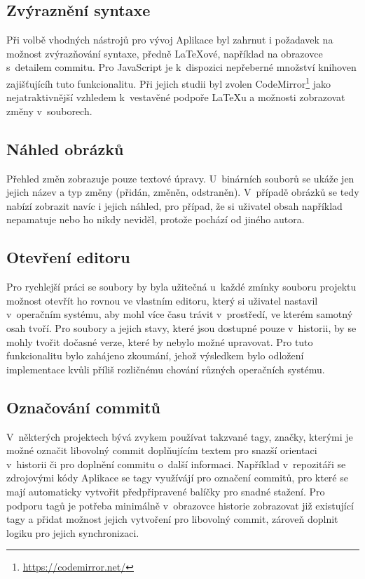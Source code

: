 \subsection{Zvýraznění syntaxe}

Při volbě vhodných nástrojů pro vývoj Aplikace byl zahrnut i požadavek na možnost zvýrazňování syntaxe, předně \LaTeX{ové}, například na obrazovce s~detailem commitu. Pro JavaScript je k~dispozici nepřeberné množství knihoven zajišťujícíh tuto funkcionalitu. Při jejich studii byl zvolen CodeMirror\footnote{\url{https://codemirror.net/}} jako nejatraktivnější vzhledem k~vestavěné podpoře \LaTeX{u} a možnosti zobrazovat změny v~souborech.

\subsection{Náhled obrázků}

Přehled změn zobrazuje pouze textové úpravy. U~binárních souborů se ukáže jen jejich název a typ změny (přidán, změněn, odstraněn). V~případě obrázků se tedy nabízí zobrazit navíc i jejich náhled, pro případ, že si uživatel obsah například nepamatuje nebo ho nikdy neviděl, protože pochází od jiného autora.

\subsection{Otevření editoru}

Pro rychlejší práci se soubory by byla užitečná u~každé zmínky souboru projektu možnost otevřít ho rovnou ve vlastním editoru, který si uživatel nastavil v~operačním systému, aby mohl více času trávit v~prostředí, ve kterém samotný osah tvoří. Pro soubory a jejich stavy, které jsou dostupné pouze v~historii, by se mohly tvořit dočasné verze, které by nebylo možné upravovat. Pro tuto funkcionalitu bylo zahájeno zkoumání, jehož výsledkem bylo odložení implementace kvůli příliš rozličnému chování různých operačních systému.

\subsection{Označování commitů}

V~některých projektech bývá zvykem používat takzvané tagy, značky, kterými je možné označit libovolný commit doplňujícím textem pro snazší orientaci v~historii či pro doplnění commitu o~další informaci. Například v~repozitáři se zdrojovými kódy Aplikace se tagy využívájí pro označení commitů, pro které se mají automaticky vytvořit předpřipravené balíčky pro snadné stažení. Pro podporu tagů je potřeba minimálně v~obrazovce historie zobrazovat již existující tagy a přidat možnost jejich vytvoření pro libovolný commit, zároveň doplnit logiku pro jejich synchronizaci.

